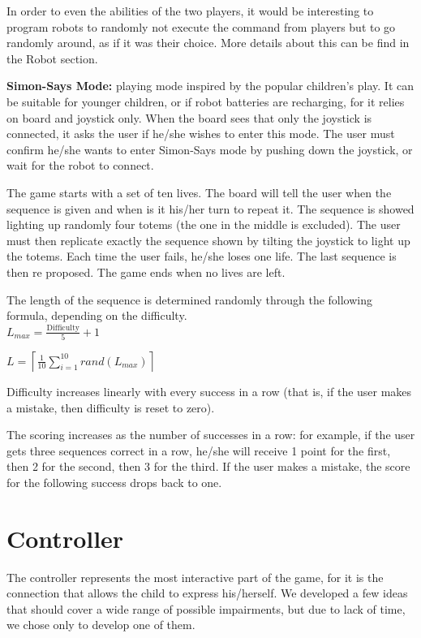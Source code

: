 \documentclass[a4paper,twoside]{book}
\begin{document}
In order to even the abilities of the two players, it would be interesting to program robots to randomly not execute the command from players but to go randomly around, as if it was their choice. More details about this can be find in the Robot section.


\textbf{Simon-Says Mode:} playing mode inspired by the popular children's play. It can be suitable for younger children, or if robot batteries are recharging, for it relies on board and joystick only. When the board sees that only the joystick is connected, it asks the user if he/she wishes to enter this mode. The user must confirm he/she wants to enter Simon-Says mode by pushing down the joystick, or wait for the robot to connect. 

The game starts with a set of ten lives. The board will tell the user when the sequence is given and when is it his/her turn to repeat it. The sequence is showed lighting up randomly four totems (the one in the middle is excluded). The user must then replicate exactly the sequence shown by tilting the joystick to light up the totems. Each time the user fails, he/she loses one life. The last sequence is then re proposed.  The game ends when no lives are left.

The length of the sequence is determined randomly through the following formula, depending on the difficulty. 
\\
$L_{max} = \frac{\mathrm{Difficulty}}{5}+1$

$L = \left \lceil \frac{1}{10}\sum_{i=1}^{10} rand\left(L_{max}\right) \right \rceil$

Difficulty increases linearly with every success in a row (that is, if the user makes a mistake, then difficulty is reset to zero).

The scoring increases as the number of successes in a row: for example, if the user gets three sequences correct in a row, he/she will receive 1 point for the first, then 2 for the second, then 3 for the third. If the user makes a mistake, the score for the following success drops back to one.


\section{Controller}

The controller represents the most interactive part of the game, for it is the connection that allows the child to express his/herself.
We developed a few ideas that should cover a wide range of possible impairments, but due to lack of time, we chose only to develop one of them.
\end{document}
